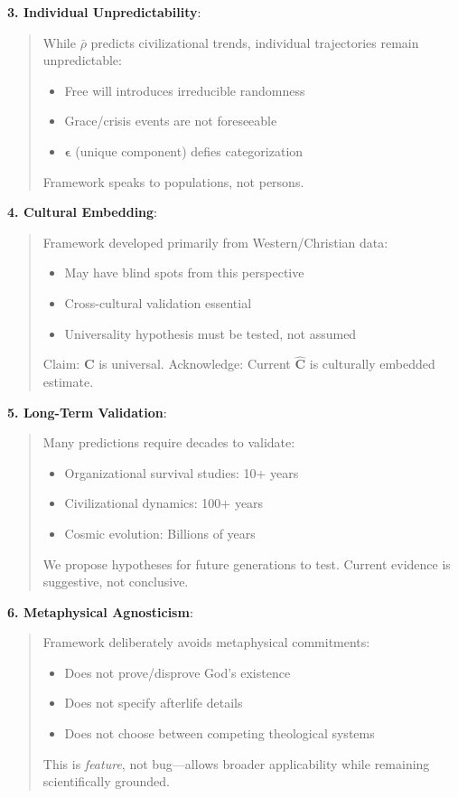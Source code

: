\documentclass[11pt,a4paper]{article}
\theoremstyle{definition}
\theoremstyle{remark}
\begin{document}
\begin{small}
\begin{enumerate}
\begin{protocol}
\begin{mdframed}[backgroundcolor=red!10,linewidth=2pt]
\textbf{3. Individual Unpredictability}:
\begin{quote}
While \(\bar{\rho}\) predicts civilizational trends, individual trajectories remain unpredictable:
\begin{itemize}[nosep]
    \item Free will introduces irreducible randomness
    \item Grace/crisis events are not foreseeable
    \item \(\boldsymbol{\epsilon}\) (unique component) defies categorization
\end{itemize}
Framework speaks to populations, not persons.
\end{quote}

\textbf{4. Cultural Embedding}:
\begin{quote}
Framework developed primarily from Western/Christian data:
\begin{itemize}[nosep]
    \item May have blind spots from this perspective
    \item Cross-cultural validation essential
    \item Universality hypothesis must be tested, not assumed
\end{itemize}
Claim: \(\mathbf{C}\) is universal. Acknowledge: Current \(\hat{\mathbf{C}}\) is culturally embedded estimate.
\end{quote}

\textbf{5. Long-Term Validation}:
\begin{quote}
Many predictions require decades to validate:
\begin{itemize}[nosep]
    \item Organizational survival studies: 10+ years
    \item Civilizational dynamics: 100+ years
    \item Cosmic evolution: Billions of years
\end{itemize}
We propose hypotheses for future generations to test. Current evidence is suggestive, not conclusive.
\end{quote}

\textbf{6. Metaphysical Agnosticism}:
\begin{quote}
Framework deliberately avoids metaphysical commitments:
\begin{itemize}[nosep]
    \item Does not prove/disprove God's existence
    \item Does not specify afterlife details
    \item Does not choose between competing theological systems
\end{itemize}
This is \textit{feature}, not bug—allows broader applicability while remaining scientifically grounded.
\end{quote}


\end{mdframed}
\end{protocol}
\end{enumerate}
\end{small}
\end{document}
